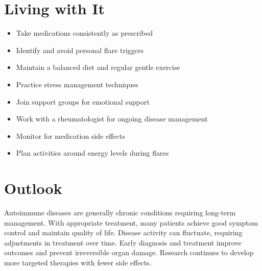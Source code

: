 \section{Living with It}
\begin{itemize}[noitemsep]
  \item Take medications consistently as prescribed
  \item Identify and avoid personal flare triggers
  \item Maintain a balanced diet and regular gentle exercise
  \item Practice stress management techniques
  \item Join support groups for emotional support
  \item Work with a rheumatologist for ongoing disease management
  \item Monitor for medication side effects
  \item Plan activities around energy levels during flares
\end{itemize}
\section{Outlook}
Autoimmune diseases are generally chronic conditions requiring long-term management. With appropriate treatment, many patients achieve good symptom control and maintain quality of life. Disease activity can fluctuate, requiring adjustments in treatment over time. Early diagnosis and treatment improve outcomes and prevent irreversible organ damage. Research continues to develop more targeted therapies with fewer side effects.
